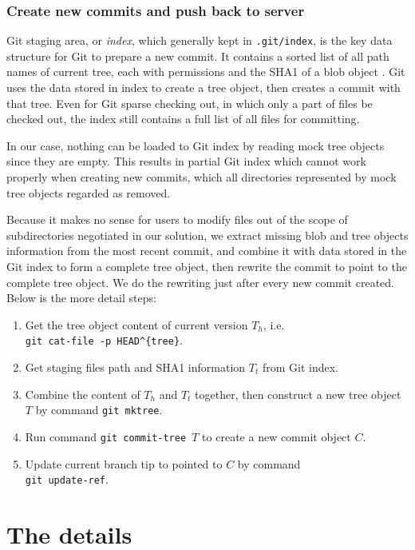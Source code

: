 \documentclass[preprint]{sigplanconf}
\begin{document}
\subsubsection{Create new commits and push back to server}
Git staging area, or \emph{index}, which generally kept in \verb|.git/index|,
is the key data structure for Git to prepare a new commit.
It contains a sorted list of all path names of current tree, each with
permissions and the SHA1 of a blob object \cite{idx-format}.
Git uses the data stored in index to create a tree object, then creates a
commit with that tree.
Even for Git sparse checking out, in which only a part of files be checked
out, the index still contains a full list of all files for committing.

In our case, nothing can be loaded to Git index by reading mock tree objects
since they are empty.
This results in partial Git index which cannot work properly when creating new
commits, which all directories represented by mock tree objects regarded as
removed.

Because it makes no sense for users to modify files out of the scope of
subdirectories negotiated in our solution, we extract missing blob and tree
objects information from the most recent commit, and combine it with data
stored in the Git index to form a complete tree object, then rewrite the commit
to point to the complete tree object.
We do the rewriting just after every new commit created.
Below is the more detail steps:

\begin{enumerate}
  \item Get the tree object content of current version $T_h$, i.e. \\
        \verb|git cat-file -p HEAD^{tree}|.
  \item Get staging files path and SHA1 information $T_t$ from Git index.
  \item Combine the content of $T_h$ and $T_t$ together, then construct a new
        tree object $T$ by command \verb|git mktree|.
  \item Run command \verb|git commit-tree |$T$ to create a new commit object
        $C$.
  \item Update current branch tip to pointed to $C$ by command \\
        \verb|git update-ref|.
\end{enumerate}




\section{The details}
\end{document}
